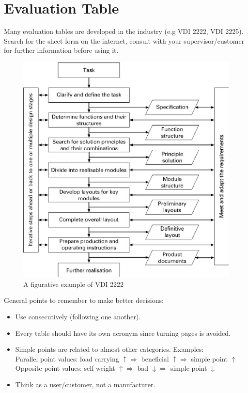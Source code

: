 \section{Evaluation Table}
Many evaluation tables are developed in the industry (e.g VDI 2222, VDI 2225). Search for the sheet form on the internet, consult with your supervisor/customer for further information before using it.
\begin{figure}[ht]
	\centering
	\includegraphics{images/01}
	\caption{A figurative example of VDI 2222}
	\label{fig:01}
\end{figure}

General points to remember to make better decisions:
\begin{itemize}
	\item Use consecutively (following one another).
	\item Every table should have its own acronym since turning pages is avoided.
	\item Simple points are related to almost other categories. Examples:\\
	Parallel point values: load carrying $ \uparrow \Rightarrow $ beneficial $ \uparrow \Rightarrow $ simple point $ \uparrow $\\
	Opposite point values: self-weight $ \uparrow \Rightarrow $ bad $ \downarrow \Rightarrow $ simple point $ \downarrow $
	\item Think as a user/customer, not a manufacturer.
\end{itemize}
